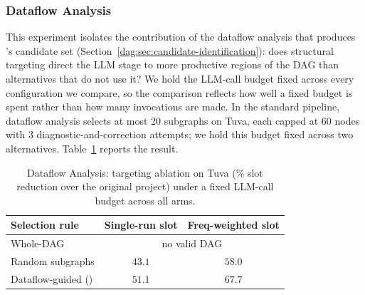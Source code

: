 
\subsubsection{Dataflow Analysis}
\label{dag:sec:eval-ablation-dataflow}

This experiment isolates the contribution of the dataflow analysis that produces \dagsmith{}'s candidate set (Section~\ref{dag:sec:candidate-identification}): does structural targeting direct the LLM stage to more productive regions of the DAG than alternatives that do not use it? We hold the LLM-call budget fixed across every configuration we compare, so the comparison reflects how well a fixed budget is spent rather than how many invocations are made. In the standard pipeline, dataflow analysis selects at most 20 subgraphs on Tuva, each capped at 60 nodes with 3 diagnostic-and-correction attempts; we hold this budget fixed across two alternatives. Table~\ref{dag:tab:ablation-dataflow} reports the result.

\begin{table}[tb]
\centering
\caption{Dataflow Analysis: targeting ablation on Tuva (\% slot reduction over the original project) under a fixed LLM-call budget across all arms.}
\inv
\label{dag:tab:ablation-dataflow}
\small
\begin{tabular}{lcc}
\toprule
Selection rule & Single-run slot & Freq-weighted slot \\
\midrule
Whole-DAG                  & \multicolumn{2}{c}{no valid DAG} \\
Random subgraphs           & $43.1$ & $58.0$ \\
Dataflow-guided (\dagsmith{})  & $\mathbf{51.1}$ & $\mathbf{67.7}$ \\
\bottomrule
\end{tabular}
\inv
\end{table}

